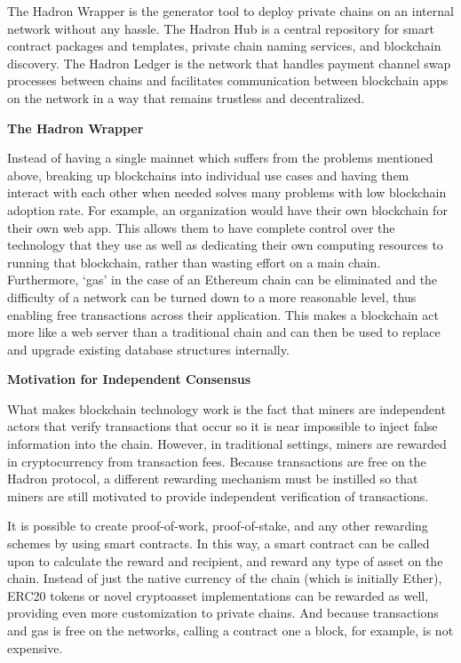 \documentclass{%
	article}
\begin{document}
The Hadron Wrapper is the generator tool to deploy private chains on an internal network without any hassle. The Hadron Hub is a central repository for smart contract packages and templates, private chain naming services, and blockchain discovery. The Hadron Ledger is the network that handles payment channel swap processes between chains and facilitates communication between blockchain apps on the network in a way that remains trustless and decentralized.

\begin{center}
\textbf{The Hadron Wrapper}
\end{center}

Instead of having a single mainnet which suffers from the problems mentioned above, breaking up blockchains into individual use cases and having them interact with each other when needed solves many problems with low blockchain adoption rate. For example, an organization would have their own blockchain for their own web app. This allows them to have complete control over the technology that they use as well as dedicating their own computing resources to running that blockchain, rather than wasting effort on a main chain. Furthermore, ‘gas’ in the case of an Ethereum chain can be eliminated and the difficulty of a network can be turned down to a more reasonable level, thus enabling free transactions across their application. This makes a blockchain act more like a web server than a traditional chain and can then be used to replace and upgrade existing database structures internally.

\begin{center}
\textbf{Motivation for Independent Consensus}
\end{center}

What makes blockchain technology work is the fact that miners are independent actors that verify transactions that occur so it is near impossible to inject false information into the chain. However, in traditional settings, miners are rewarded in cryptocurrency from transaction fees. Because transactions are free on the Hadron protocol, a different rewarding mechanism must be instilled so that miners are still motivated to provide independent verification of transactions.

It is possible to create proof-of-work, proof-of-stake, and any other rewarding schemes by using smart contracts. In this way, a smart contract can be called upon to calculate the reward and recipient, and reward any type of asset on the chain. Instead of just the native currency of the chain (which is initially Ether), ERC20 tokens or novel cryptoasset implementations can be rewarded as well, providing even more customization to private chains. And because transactions and gas is free on the networks, calling a contract one a block, for example, is not expensive.
\end{document}
